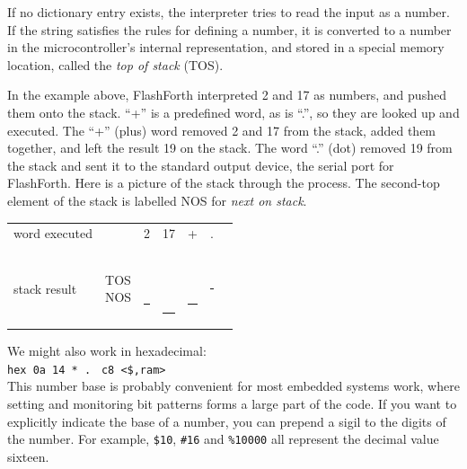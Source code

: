 \documentclass[12pt,a4paper]{article}
\begin{document}
\medskip
If no dictionary entry exists, the interpreter tries to read the input as a number.  
If the string satisfies the rules for defining a number, it is converted to a number
in the microcontroller's internal representation, and stored in a special memory location,
called the \textit{top of stack} (TOS).

\medskip
In the example above, FlashForth interpreted 2 and 17 as numbers, and pushed them onto the stack.
``+'' is a predefined word, as is ``.'', so they are looked up and executed.
The ``+'' (plus) word removed 2 and 17 from the stack, added them together, 
and left the result 19 on the stack. 
The word ``.'' (dot) removed 19 from the stack and sent it to the standard output device,
the serial port for FlashForth.
Here is a picture of the stack through the process.
The second-top element of the stack is labelled NOS for \textit{next on stack}.
\begin{center}
 \begin{tabular}{lc|ccccc}
 word executed & & 2 & 17 & + & . \\
 \\
 stack result  
 & \parbox[t]{35pt}{TOS \\ NOS} 
 & \parbox[t]{25pt}{ \\ \rule{20pt}{2pt}} 
 & \parbox[t]{25pt}{ \\  \\ \rule{20pt}{2pt}}
 & \parbox[t]{25pt}{ \\ \rule{20pt}{2pt}}
 & \parbox[t]{25pt}{\rule{20pt}{2pt}} \\
 \end{tabular}
\end{center}


\medskip
We might also work in hexadecimal: \vspace{7pt} \\
\verb!hex 0a 14 * .! \fbox{$\hookleftarrow$} \verb! c8 <$,ram>! \vspace{7pt} \\
This number base is probably convenient for most embedded systems work,
where setting and monitoring bit patterns forms a large part of the code.
If you want to explicitly indicate the base of a number, you can prepend a sigil to the
digits of the number.
For example, \verb!$10!, \verb!#16! and \verb!%10000! all represent the decimal value sixteen.
\end{document}
